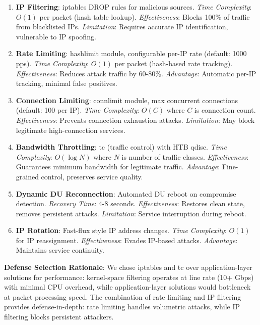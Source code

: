 \documentclass[conference]{IEEEtran}
\begin{document}
\begin{enumerate}
    \item \textbf{IP Filtering}: iptables DROP rules for malicious sources. \textit{Time Complexity}: $O(1)$ per packet (hash table lookup). \textit{Effectiveness}: Blocks 100\% of traffic from blacklisted IPs. \textit{Limitation}: Requires accurate IP identification, vulnerable to IP spoofing.
    
    \item \textbf{Rate Limiting}: hashlimit module, configurable per-IP rate (default: 1000 pps). \textit{Time Complexity}: $O(1)$ per packet (hash-based rate tracking). \textit{Effectiveness}: Reduces attack traffic by 60-80\%. \textit{Advantage}: Automatic per-IP tracking, minimal false positives.
    
    \item \textbf{Connection Limiting}: connlimit module, max concurrent connections (default: 100 per IP). \textit{Time Complexity}: $O(C)$ where $C$ is connection count. \textit{Effectiveness}: Prevents connection exhaustion attacks. \textit{Limitation}: May block legitimate high-connection services.
    
    \item \textbf{Bandwidth Throttling}: tc (traffic control) with HTB qdisc. \textit{Time Complexity}: $O(\log N)$ where $N$ is number of traffic classes. \textit{Effectiveness}: Guarantees minimum bandwidth for legitimate traffic. \textit{Advantage}: Fine-grained control, preserves service quality.
    
    \item \textbf{Dynamic DU Reconnection}: Automated DU reboot on compromise detection. \textit{Recovery Time}: 4-8 seconds. \textit{Effectiveness}: Restores clean state, removes persistent attacks. \textit{Limitation}: Service interruption during reboot.
    
    \item \textbf{IP Rotation}: Fast-flux style IP address changes. \textit{Time Complexity}: $O(1)$ for IP reassignment. \textit{Effectiveness}: Evades IP-based attacks. \textit{Advantage}: Maintains service continuity.
\end{enumerate}

\textbf{Defense Selection Rationale}: We chose iptables and tc over application-layer solutions for performance: kernel-space filtering operates at line rate (10+ Gbps) with minimal CPU overhead, while application-layer solutions would bottleneck at packet processing speed. The combination of rate limiting and IP filtering provides defense-in-depth: rate limiting handles volumetric attacks, while IP filtering blocks persistent attackers.
\end{document}
